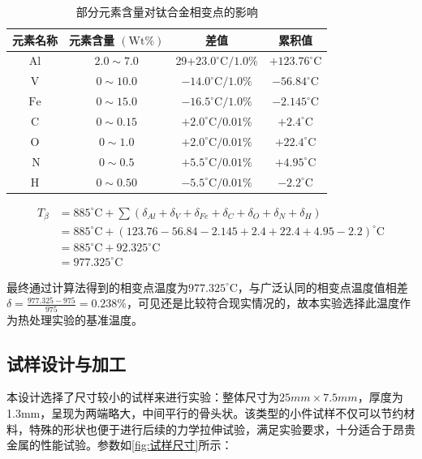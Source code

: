 \begin{table}[htbp]
	\centering
	\caption{部分元素含量对钛合金相变点的影响}
	\label{sec:chem4ti}
	\begin{tabular}{cccc}
		\hline 元素名称 & 元素含量 $(\mathrm{Wt} \%)$ & 差值&累积值 \\
		\hline $\mathrm{Al}$ & $2.0 \sim 7.0$ & 29+$23.0^{\circ} \mathrm{C} / 1.0 \%$ & $+123.76^{\circ} \mathrm{C}$ \\
		$\mathrm{V}$ & $0 \sim 10.0$ & $-14.0^{\circ} \mathrm{C} / 1.0 \%$ & $-56.84^{\circ} \mathrm{C}$ \\
		$\mathrm{Fe}$ & $0 \sim 15.0$ & $-16.5^{\circ} \mathrm{C} / 1.0 \%$ & $-2.145^{\circ} \mathrm{C}$
		\\
		$\mathrm{C}$ & $0 \sim 0.15$ & $+2.0^{\circ} \mathrm{C} / 0.01 \%$ &$ +2.4^{\circ} \mathrm{C} $\\
		$\mathrm{O}$ & $0 \sim 1.0$ & $+2.0^{\circ} \mathrm{C} / 0.01 \%$& $ +22.4^{\circ} \mathrm{C} $\\
		$\mathrm{~N}$ & $0 \sim 0.5$ & $+5.5^{\circ} \mathrm{C} / 0.01 \%$& $ +4.95^{\circ} \mathrm{C} $\\
		$\mathrm{H}$ & $0 \sim 0.50$ & $-5.5^{\circ} \mathrm{C} / 0.01 \%$ &$ -2.2^{\circ} \mathrm{C} $\\
		\hline
	\end{tabular}
\end{table}

\begin{equation}
	\begin{aligned}
		T_\beta&=885^{\circ} \mathrm{C}+\sum (\delta_{Al}+\delta_{V}+\delta_{Fe}+\delta_{C}+\delta_{O}+\delta_{N}+\delta_{H})\\
		&= 885^{\circ} \mathrm{C}+(123.76-56.84-2.145+2.4+22.4+4.95-2.2)^{\circ} \mathrm{C}\\
		&=885^{\circ} \mathrm{C}+92.325^{\circ} \mathrm{C}\\
		&=977.325^{\circ} \mathrm{C}
	\end{aligned}
\end{equation}

最终通过计算法得到的相变点温度为$977.325^{\circ} \mathrm{C} $，与广泛认同的相变点温度值相差$\delta=\frac{977.325-975}{975}=0.238\% $，可见还是比较符合现实情况的，故本实验选择此温度作为热处理实验的基准温度。


\subsection{试样设计与加工}
本设计选择了尺寸较小的试样来进行实验：整体尺寸为$ 25mm\times 7.5mm $，厚度为1.3mm，呈现为两端略大，中间平行的骨头状。该类型的小件试样不仅可以节约材料，特殊的形状也便于进行后续的力学拉伸试验，满足实验要求，十分适合于昂贵金属的性能试验。参数如\ref{fig:试样尺寸}所示：

